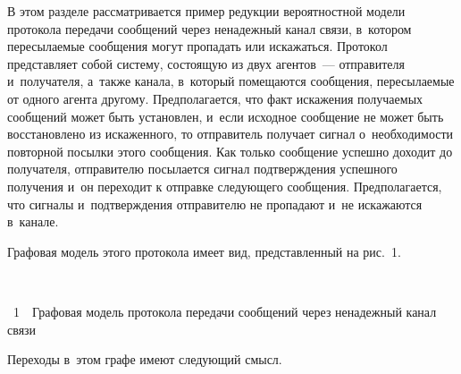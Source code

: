 \begin{multicols}{2}
В этом разделе рассматривается пример редукции вероятностной модели
протокола передачи сообщений через ненадежный канал связи, в~котором
пересылаемые сообщения могут пропадать или искажаться. Протокол
представляет собой систему, состоящую из двух агентов~--- отправителя
и~получателя, а~также канала,  в~который помещаются сообщения,
 пересылаемые от одного агента другому.
 Предполагается, что факт искажения
 получаемых сообщений может быть установлен, и~если исходное сообщение не может быть восстановлено
 из искаженного, то отправитель получает  сигнал о~необходимости повторной посылки
 этого сообщения. Как только сообщение успешно доходит до получателя,
отправителю посылается сигнал подтверждения успешного
получения и~он переходит к отправке следующего сообщения.
  Предполагается, что сигналы и~подтверждения
  отправителю не пропадают и~не искажаются в~канале.

Графовая модель этого протокола имеет  вид, представленный на рис.~1.

\vspace*{6pt}

\begin{center}  %
\vspace*{2pt}
\mbox{%
 \epsfxsize=72.154mm
 }
 \end{center}

\noindent
{{\figurename~1}\ \ \small{Графовая модель протокола передачи сообщений через
ненадежный канал связи}}


\vspace*{12pt}


\addtocounter{figure}{1}


Переходы в~этом графе имеют следующий смысл.


\end{multicols}
